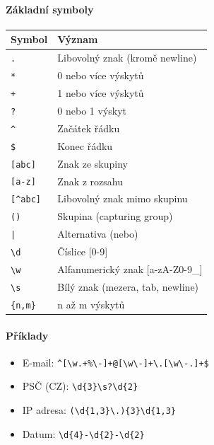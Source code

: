 \paragraph{Základní symboly}
\begin{center}
\begin{tabular}{ll}
\toprule
\textbf{Symbol} & \textbf{Význam} \\
\midrule
\texttt{.} & Libovolný znak (kromě newline) \\
\texttt{*} & 0 nebo více výskytů \\
\texttt{+} & 1 nebo více výskytů \\
\texttt{?} & 0 nebo 1 výskyt \\
\texttt{\^{}} & Začátek řádku \\
\texttt{\$} & Konec řádku \\
\texttt{[abc]} & Znak ze skupiny \\
\texttt{[a-z]} & Znak z rozsahu \\
\texttt{[{\^{}}abc]} & Libovolný znak mimo skupinu \\
\texttt{()} & Skupina (capturing group) \\
\texttt{|} & Alternativa (nebo) \\
\texttt{\textbackslash d} & Číslice [0-9] \\
\texttt{\textbackslash w} & Alfanumerický znak [a-zA-Z0-9\_] \\
\texttt{\textbackslash s} & Bílý znak (mezera, tab, newline) \\
\texttt{\{n,m\}} & n až m výskytů \\
\bottomrule
\end{tabular}
\end{center}

\paragraph{Příklady}
\begin{itemize}
  \item E-mail: \texttt{\^{}[\textbackslash w.+\%\textbackslash -]+@[\textbackslash w\textbackslash -]+\textbackslash.[\textbackslash w\textbackslash -.]+\$}
  \item PSČ (CZ): \texttt{\textbackslash d\{3\}\textbackslash s?\textbackslash d\{2\}}
  \item IP adresa: \texttt{(\textbackslash d\{1,3\}\textbackslash.)\{3\}\textbackslash d\{1,3\}}
  \item Datum: \texttt{\textbackslash d\{4\}-\textbackslash d\{2\}-\textbackslash d\{2\}}
\end{itemize}

